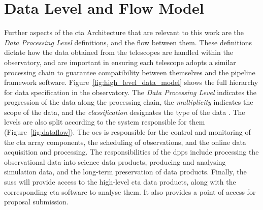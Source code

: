 
\section{Data Level and Flow Model} \label{section:data_levels}

Further aspects of the \gls{cta} Architecture that are relevant to this work are the \textit{Data Processing Level} definitions, and the flow between them. These definitions dictate how the data obtained from the telescopes are handled within the observatory, and are important in ensuring each telescope adopts a similar processing chain to guarantee compatibility between themselves and the pipeline framework software. Figure~\ref{fig:high_level_data_model} shows the full hierarchy for data specification in the observatory. The \textit{Data Processing Level} indicates the progression of the data along the processing chain, the \textit{multiplicity} indicates the scope of the data, and the \textit{classification} designates the type of the data \cite{Kosack2017}. The levels are also split according to the system responsible for them (Figure~\ref{fig:dataflow}). The \gls{oes} is responsible for the control and monitoring of the \gls{cta} array components, the scheduling of observations, and the online data acquisition and processing. The responsibilities of the \gls{dpps} include processing the observational data into science data products, producing and analysing simulation data, and the long-term preservation of data products. Finally, the \gls{suss} will provide access to the high-level \gls{cta} data products, along with the corresponding \gls{cta} software to analyse them. It also provides a point of access for proposal submission.

